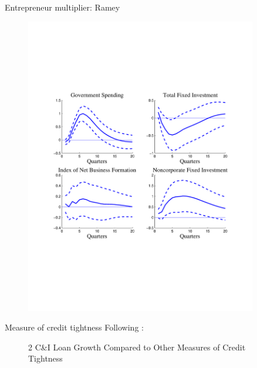 \documentclass[svgnames]{beamer}
\begin{document}
\begin{frame}{Entrepreneur multiplier: Ramey}
\begin{figure}[!ht]
\includegraphics[trim=1cm 6.5cm 1cm 6.5cm, clip=true, width=0.9\textwidth]{graph/entre_ramey.pdf}
\end{figure}
\end{frame}

\begin{frame}{Measure of credit tightness}
Following \citet{lown_credit_2006}:
\begin{figure}%
    \centering
    \qquad
    \caption{2 C\&I Loan Growth Compared to Other Measures of Credit Tightness}%
    \label{fig:example}%
\end{figure}
\end{frame}
\end{document}
